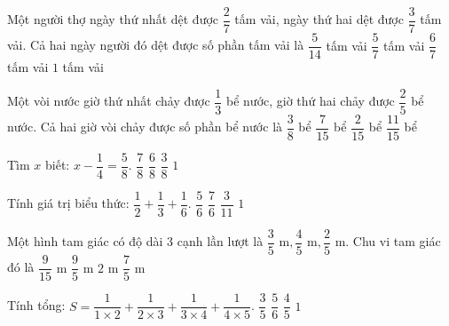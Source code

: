 \begin{ex} %
Một người thợ ngày thứ nhất dệt được $\dfrac{2}{7}$ tấm vải, ngày thứ hai dệt được $\dfrac{3}{7}$ tấm vải. Cả hai ngày người đó dệt được số phần tấm vải là
\choice
{$\dfrac{5}{14}$ tấm vải}
{\True $\dfrac{5}{7}$ tấm vải}
{$\dfrac{6}{7}$ tấm vải}
{$1$ tấm vải}
\end{ex}

\begin{ex} %
Một vòi nước giờ thứ nhất chảy được $\dfrac{1}{3}$ bể nước, giờ thứ hai chảy được $\dfrac{2}{5}$ bể nước. Cả hai giờ vòi chảy được số phần bể nước là
\choice
{$\dfrac{3}{8}$ bể}
{$\dfrac{7}{15}$ bể}
{$\dfrac{2}{15}$ bể}
{\True $\dfrac{11}{15}$ bể}
\end{ex}

\begin{ex} %
Tìm $x$ biết: $x - \dfrac{1}{4} = \dfrac{5}{8}$.
\choice
{\True $\dfrac{7}{8}$}
{$\dfrac{6}{8}$}
{$\dfrac{3}{8}$}
{$1$}
\end{ex}

\begin{ex} %
Tính giá trị biểu thức: $\dfrac{1}{2} + \dfrac{1}{3} + \dfrac{1}{6}$.
\choice
{$\dfrac{5}{6}$}
{$\dfrac{7}{6}$}
{$\dfrac{3}{11}$}
{\True $1$}
\end{ex}

\begin{ex} %
Một hình tam giác có độ dài 3 cạnh lần lượt là $\dfrac{3}{5}\text{ m}, \dfrac{4}{5}\text{ m}, \dfrac{2}{5}\text{ m}$. Chu vi tam giác đó là
\choice
{$\dfrac{9}{15}\text{ m}$}
{\True $\dfrac{9}{5}\text{ m}$}
{$2\text{ m}$}
{$\dfrac{7}{5}\text{ m}$}
\end{ex}

\begin{ex} %
Tính tổng: $S = \dfrac{1}{1 \times 2} + \dfrac{1}{2 \times 3} + \dfrac{1}{3 \times 4} + \dfrac{1}{4 \times 5}$.
\choice
{$\dfrac{3}{5}$}
{$\dfrac{5}{6}$}
{\True $\dfrac{4}{5}$}
{$1$}
\end{ex}

